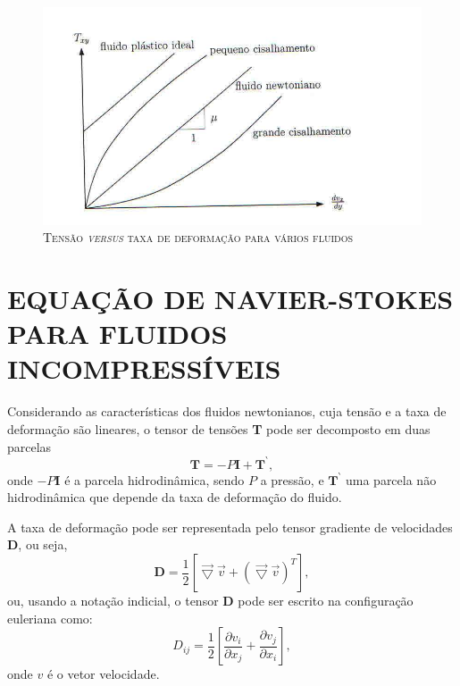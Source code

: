 \begin{figure}[H]
\centering
\includegraphics[scale=1]{figuras/fluido_newtoniano.jpg}
\caption{\textsc{Tensão \textit{versus} taxa de deformação para vários fluidos}}
\vspace{-0.1cm}
\label{fig:fluidonewtoniano}
\end{figure}

\section{EQUAÇÃO DE NAVIER-STOKES PARA FLUIDOS INCOMPRESSÍVEIS} \label{NS}

Considerando as características dos fluidos newtonianos, cuja tensão e a taxa de deformação são lineares, o tensor de tensões \textbf{T} pode ser decomposto em duas parcelas
\begin{equation}
\textbf{T} = - P \textbf{I} + \textbf{T} ^{ \backprime},
\end{equation}
onde $ - P \textbf{I} $ é a parcela hidrodinâmica, sendo $ P $ a pressão, e $ \textbf{T} ^{ \backprime} $ uma parcela não hidrodinâmica que depende da taxa de deformação do fluido.

A taxa de deformação pode ser representada pelo tensor gradiente de velocidades $  \textbf{D} $, ou seja,
\begin{equation}
\textbf{D} = \dfrac{1}{2} [ \vec{ \bigtriangledown} \vec{v} + ( \vec{ \bigtriangledown} \vec{v}) ^{T}],
\end{equation} 
ou, usando a notação indicial, o tensor $ \textbf{D} $ pode ser escrito na configuração euleriana como:
\begin{equation}
D_{ij} = \dfrac{1}{2} \left[ \dfrac{ \partial v_{i}}{ \partial x_{j}} + \dfrac{ \partial v_{j}}{ \partial x_{i}} \right],
\end{equation}
onde $v$ é o vetor velocidade.

